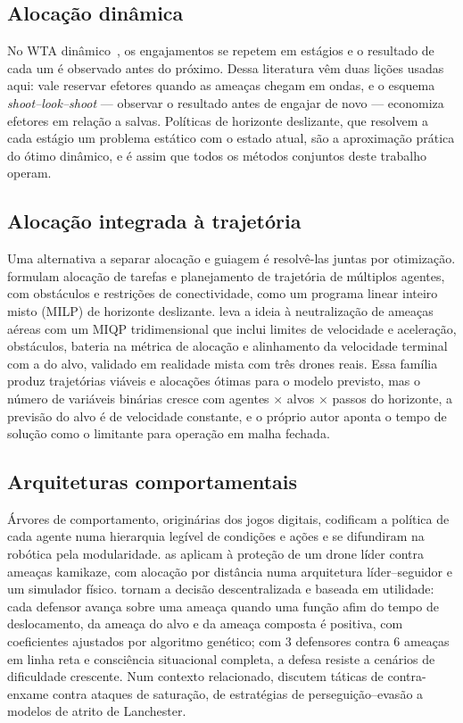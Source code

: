 \documentclass[11pt,a4paper]{article}
\begin{document}
\subsection{Alocação dinâmica}
No WTA dinâmico~\cite{hosein1990,cai2006}, os engajamentos se repetem em estágios e o resultado de cada um é observado
antes do próximo. Dessa literatura vêm duas lições usadas aqui: vale reservar efetores quando as ameaças chegam em ondas,
e o esquema \emph{shoot--look--shoot} --- observar o resultado antes de engajar de novo --- economiza efetores em relação a
salvas. Políticas de horizonte deslizante, que resolvem a cada estágio um problema estático com o estado atual, são a
aproximação prática do ótimo dinâmico, e é assim que todos os métodos conjuntos deste trabalho operam.

\subsection{Alocação integrada à trajetória}
Uma alternativa a separar alocação e guiagem é resolvê-las juntas por otimização. \citet{afonso2020} formulam alocação
de tarefas e planejamento de trajetória de múltiplos agentes, com obstáculos e restrições de conectividade, como um
programa linear inteiro misto (MILP) de horizonte deslizante. \citet{cruz2025} leva a ideia à neutralização de ameaças
aéreas com um MIQP tridimensional que inclui limites de velocidade e aceleração, obstáculos, bateria na métrica de
alocação e alinhamento da velocidade terminal com a do alvo, validado em realidade mista com três drones reais. Essa
família produz trajetórias viáveis e alocações ótimas para o modelo previsto, mas o número de variáveis binárias cresce
com agentes $\times$ alvos $\times$ passos do horizonte, a previsão do alvo é de velocidade constante, e o próprio autor
aponta o tempo de solução como o limitante para operação em malha fechada.

\subsection{Arquiteturas comportamentais}
Árvores de comportamento, originárias dos jogos digitais, codificam a política de cada agente numa hierarquia legível de
condições e ações e se difundiram na robótica pela modularidade. \citet{ricardo2023} as aplicam à proteção de um drone
líder contra ameaças kamikaze, com alocação por distância numa arquitetura líder--seguidor e um simulador físico.
\citet{feitosa2025} tornam a decisão descentralizada e baseada em utilidade: cada defensor avança sobre uma ameaça quando
uma função afim do tempo de deslocamento, da ameaça do alvo e da ameaça composta é positiva, com coeficientes ajustados
por algoritmo genético; com 3 defensores contra 6 ameaças em linha reta e consciência situacional completa, a defesa
resiste a cenários de dificuldade crescente. Num contexto relacionado, \citet{strickland2018} discutem táticas de
contra-enxame contra ataques de saturação, de estratégias de perseguição--evasão a modelos de atrito de Lanchester.
\end{document}
